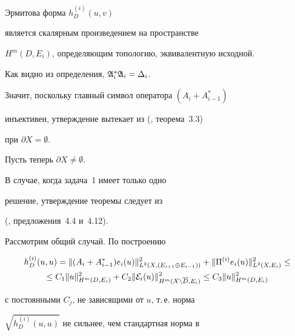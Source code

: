 \begin{thm}


\label{c.5.1}


Эрмитова форма $h^{(i)}_{D} (u,v)$


является скалярным произведением на пространстве


$H^{m} (D, E_i)$, определяющим топологию, эквивалентную исходной.


\end{thm}








\begin{pf}


Как видно из определения, ${\frak A}_i^* {\frak A}_i=\Delta_i$.


Значит, поскольку главный символ оператора $(A_i+A^*_{i-1})$


инъективен, утверждение вытекает из (\cite{Sh17}, теорема~3.3)


при $\partial X=\emptyset$.





Пусть теперь $\partial X \ne \emptyset$.


В случае, когда задача~1 имеет только одно


решение, утверждение теоремы следует из


(\cite{NaSh}, предложения~4.4 и~4.12).





Рассмотрим общий случай. По построению


\begin{multline*}


h^{(i)}_D (u,u)=\| (A_i+A^*_{i-1})e_i (u)\|^2


_{L^2 (X,(E_{i+1}\oplus E_{i-1}))}


+ \| \Pi ^{(i)} e_i (u)\| ^2_{L^2 (X, E_i)} \leq \\


%


\le C_1 \| u \|^2_{H^m (D,E_i)} +


C_2 \| {\cal E}_i(u) \|^2_{H^m (X\setminus \overline D,E_i)} \leq


C_3 \| u \|^2_{H^m (D,E_i)}


\end{multline*}


с постоянными $C_j$, не зависящими от $u$, т.\,е. норма


$\sqrt{h^{(i)}_D (u,u)}$ не сильнее, чем стандартная норма в



\end{pf}
